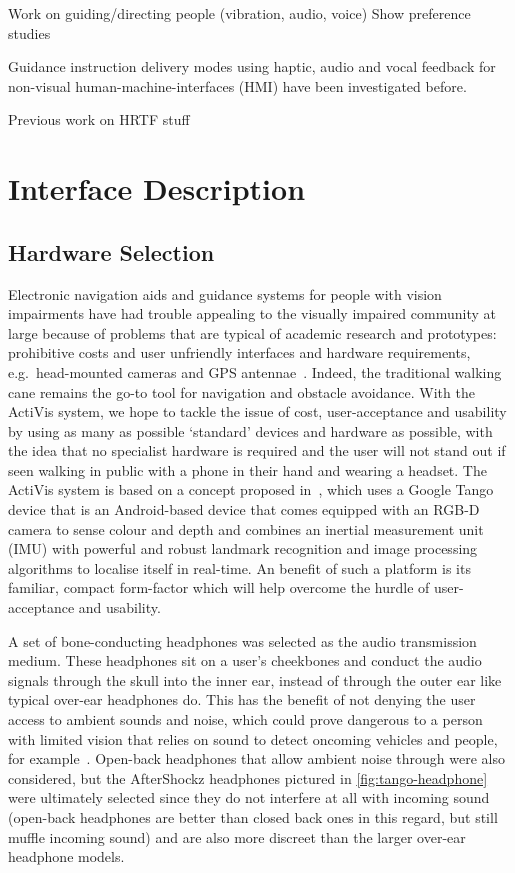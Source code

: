 \documentclass{llncs}
\begin{document}
Work on guiding/directing people (vibration, audio, voice)
Show preference studies

Guidance instruction delivery modes using haptic, audio and vocal feedback for non-visual human-machine-interfaces (HMI) have been investigated before. 

Previous work on HRTF stuff


\section{Interface Description}

\subsection{Hardware Selection}

Electronic navigation aids and guidance systems for people with vision impairments have had trouble appealing to the visually impaired community at large because of problems that are typical of academic research and prototypes: prohibitive costs and user unfriendly interfaces and hardware requirements, e.g.\ head-mounted cameras and GPS antennae~\cite{golledge2004stated,yusif2016older,arditi2013user}.
Indeed, the traditional walking cane remains the go-to tool for navigation and obstacle avoidance. 
With the ActiVis system, we hope to tackle the issue of cost, user-acceptance and usability by using as many as possible `standard' devices and hardware as possible, with the idea that no specialist hardware is required and the user will not stand out if seen walking in public with a phone in their hand and wearing a headset.
The ActiVis system is based on a concept proposed in~\cite{bellotto2013multimodal,lock2017portable}, which uses a Google Tango device that is an Android-based device that comes equipped with an RGB-D camera to sense colour and depth and combines an inertial measurement unit (IMU) with powerful and robust landmark recognition and image processing algorithms to localise itself in real-time.
An benefit of such a platform is its familiar, compact form-factor which will help overcome the hurdle of user-acceptance and usability.

A set of bone-conducting headphones was selected as the audio transmission medium.
These headphones sit on a user's cheekbones and conduct the audio signals through the skull into the inner ear, instead of through the outer ear like typical over-ear headphones do. 
This has the benefit of not denying the user access to ambient sounds and noise, which could prove dangerous to a person with limited vision that relies on sound to detect oncoming vehicles and people, for example~\cite{lichtenstein2012headphone}.
Open-back headphones that allow ambient noise through were also considered, but the AfterShockz headphones pictured in \cref{fig:tango-headphone} were ultimately selected since they do not interfere at all with incoming sound (open-back headphones are better than closed back ones in this regard, but still muffle incoming sound) and are also more discreet than the larger over-ear headphone models. 
\end{document}
